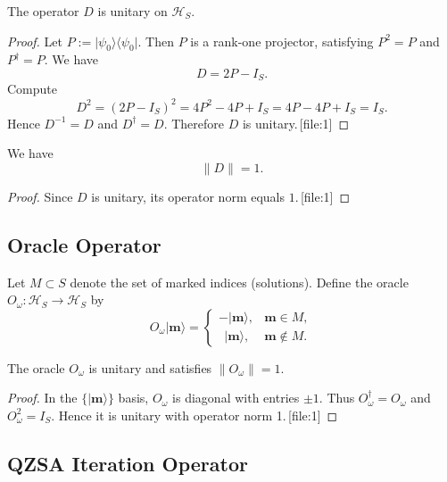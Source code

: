 \documentclass[11pt]{article}
\begin{document}
\begin{lemma}[Unitarity of \(D\)]
The operator \(D\) is unitary on \(\mathcal{H}_S\).
\end{lemma}

\begin{proof}
Let \(P := \lvert \psi_0 \rangle \langle \psi_0 \rvert\). Then \(P\) is a rank-one projector, satisfying \(P^2 = P\) and \(P^\dagger = P\). We have
\[
D = 2P - I_S.
\]
Compute
\[
D^2 = (2P - I_S)^2 = 4P^2 - 4P + I_S = 4P - 4P + I_S = I_S.
\]
Hence \(D^{-1} = D\) and \(D^\dagger = D\). Therefore \(D\) is unitary.\,[file:1]
\end{proof}

\begin{corollary}
We have
\[
\|D\| = 1.
\]
\end{corollary}

\begin{proof}
Since \(D\) is unitary, its operator norm equals \(1\).\,[file:1]
\end{proof}

\subsection{Oracle Operator}

Let \(M \subset S\) denote the set of marked indices (solutions). Define the oracle \(O_\omega: \mathcal{H}_S \to \mathcal{H}_S\) by
\begin{equation}
    O_\omega \lvert \mathbf{m} \rangle =
    \begin{cases}
        - \lvert \mathbf{m} \rangle, & \mathbf{m} \in M,\\[2pt]
        \ \ \lvert \mathbf{m} \rangle, & \mathbf{m} \notin M.
    \end{cases}
\end{equation}

\begin{lemma}
The oracle \(O_\omega\) is unitary and satisfies \(\|O_\omega\| = 1\).
\end{lemma}

\begin{proof}
In the \(\{\lvert \mathbf{m} \rangle\}\) basis, \(O_\omega\) is diagonal with entries \(\pm 1\). Thus \(O_\omega^\dagger = O_\omega\) and \(O_\omega^2 = I_S\). Hence it is unitary with operator norm 1.\,[file:1]
\end{proof}

\subsection{QZSA Iteration Operator}
\end{document}
